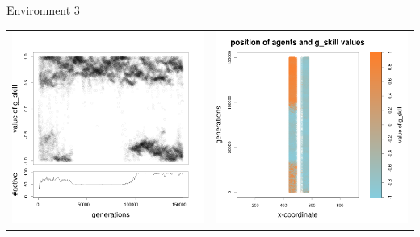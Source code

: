 \documentclass[8pt, handout=show,notes=show]{beamer}
\begin{document}
\begin{frame}{Environment 3}
\begin{table}[H]
\begin{tabular}{cc}
 \newline
 \includegraphics[width=\imgSize]{../images/5StaticEnv/Gplot99_staticEnv3}&\includegraphics[width=\imgSize]{../images/5StaticEnv/Gplot99Static_staticEnv3}\\
\end{tabular}

\end{table}
\end{frame}
\end{document}
